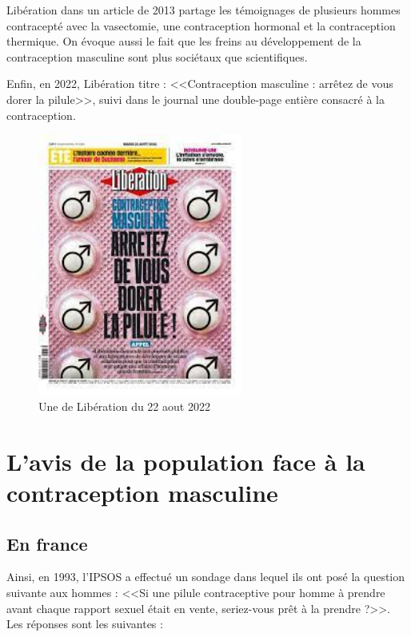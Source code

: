 \documentclass[12pt,a4paper]{report}
\begin{document}
Libération dans un article de 2013 partage les témoignages de plusieurs hommes contracepté avec la vasectomie, une contraception hormonal et la contraception thermique. On évoque aussi le fait que les freins au développement de la contraception masculine sont plus sociétaux que scientifiques. \cite{genthialonContraceptionPasseMale2013}

Enfin, en 2022, Libération titre : <<Contraception masculine : arrêtez de vous dorer la pilule>>, suivi dans le journal une double-page entière consacré à la contraception.\cite{ContraceptionMasculineScience}

\begin{figure}[H]
    \centering
    \includegraphics[width=0.6\textwidth]{images/questionnaire/Une_libe.png}
    \caption{Une de Libération du 22 aout 2022}
    \label{fig:libertion}
\end{figure}

\section{L'avis de la population face à la contraception masculine}

\subsection{En france}

Ainsi, en 1993, l'IPSOS a effectué un sondage dans lequel ils ont posé la question suivante aux hommes : <<Si une pilule contraceptive pour homme à prendre avant chaque rapport sexuel était en vente, seriez-vous prêt à la prendre ?>>.\cite{PiluleMasculine1993} Les réponses sont les suivantes :
\end{document}
